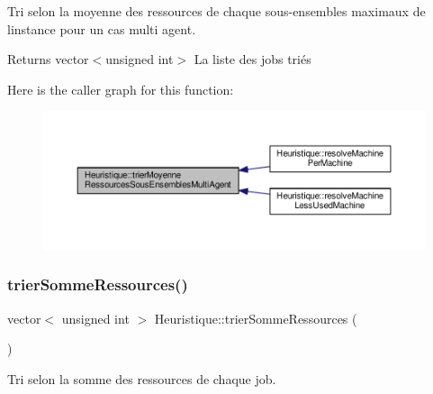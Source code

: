 Tri selon la moyenne des ressources de chaque sous-\/ensembles maximaux de l\textquotesingle{}instance pour un cas multi agent. 

\begin{DoxyReturn}{Returns}
vector$<$unsigned int$>$ La liste des jobs triés 
\end{DoxyReturn}
Here is the caller graph for this function\+:
\nopagebreak
\begin{figure}[H]
\begin{center}
\leavevmode
\includegraphics[width=350pt]{classHeuristique_a7dcb7f68553d90195c39950ed456e266_icgraph}
\end{center}
\end{figure}
\mbox{\label{classHeuristique_a6101d6d238a7667b820b50629e4d497f}} 
\subsubsection{\texorpdfstring{trier\+Somme\+Ressources()}{trierSommeRessources()}}
{\footnotesize\ttfamily vector$<$ unsigned int $>$ Heuristique\+::trier\+Somme\+Ressources (\begin{DoxyParamCaption}{ }\end{DoxyParamCaption})}



Tri selon la somme des ressources de chaque job. 


